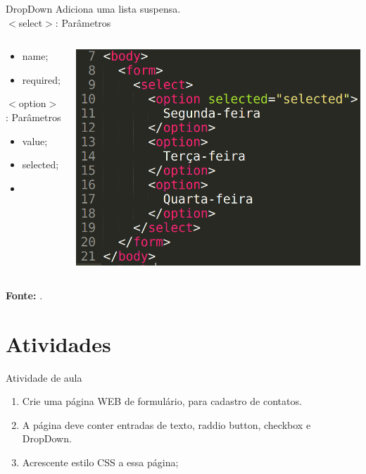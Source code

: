 \documentclass{beamer}
\begin{document}
\begin{frame}{DropDown}
  Adiciona uma lista suspensa. \\$<$select$>$: Parâmetros
    \begin{columns}
    \begin{column}{0.3 \textwidth}
      \small
     \begin{itemize}
       \item name;
        \item required;
     \end{itemize}
     $<$option$>$: Parâmetros
     \begin{itemize}
        \item value;
        \item selected;
        \item 
     \end{itemize}
    \end{column}
    
    \begin{column}{0.6\textwidth}
     \includegraphics[height=0.5\paperheight]{fig/aula4/aula4_12.png}
    \end{column}
  \end{columns}
  \tiny{\textbf{Fonte:} \cite{wschool2021html}}.
\end{frame}
\section{Atividades}
\begin{frame}{Atividade de aula}
\begin{enumerate}
 \item Crie uma página WEB de formulário, para cadastro de contatos.
 \item A página deve conter entradas de texto, raddio button, checkbox e DropDown.
  \item Acrescente estilo CSS a essa página;
\end{enumerate}
 
\end{frame}
\end{document}
